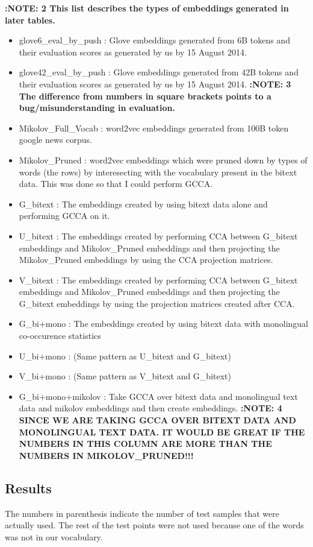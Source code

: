 \documentclass[11pt]{article}
\begin{document}
\textbf{:NOTE: 2 This list describes the types of
  embeddings generated in later tables.}
\begin{itemize}[noitemsep]
\item glove6\_eval\_by\_push : Glove embeddings generated from 6B
  tokens and their evaluation scores as generated by us by 15 August
  2014. 
\item glove42\_eval\_by\_push : Glove embeddings generated from 42B
  tokens and their evaluation scores as generated by us by 15 August
  2014. \textbf{:NOTE: 3 The difference from numbers in square brackets points to a
  bug/misunderstanding in evaluation.}
\item Mikolov\_Full\_Vocab : word2vec embeddings generated from 100B token
  google news corpus.
\item Mikolov\_Pruned : word2vec embeddings which were pruned down by
  types of words (the rows) by interesecting with the vocabulary
  present in the bitext data. This was done so that I could perform
  GCCA. 
\item G\_bitext : The embeddings created by using bitext data alone
  and performing GCCA on it. 
\item U\_bitext : The embeddings created by performing CCA between
  G\_bitext embeddings and Mikolov\_Pruned embeddings and then
  projecting the Mikolov\_Pruned embeddings by using the CCA
  projection matrices. 
\item V\_bitext : The embeddings created by performing CCA between
  G\_bitext embeddings and Mikolov\_Pruned embeddings and then
  projecting the G\_bitext embeddings by using the projection matrices
  created after CCA. 
\item G\_bi+mono : The embeddings created by using bitext data with
  monolingual co-occurence statistics
\item U\_bi+mono : (Same pattern as U\_bitext and G\_bitext)
\item V\_bi+mono : (Same pattern as V\_bitext and G\_bitext)
\item G\_bi+mono+mikolov : Take GCCA over bitext data and monolingual
  text data and mikolov embeddings and then create
  embeddings. \textbf{:NOTE: 4 SINCE WE ARE TAKING GCCA OVER BITEXT DATA AND
    MONOLINGUAL TEXT DATA. IT WOULD BE GREAT IF THE NUMBERS IN
    THIS COLUMN ARE MORE THAN THE NUMBERS IN MIKOLOV\_PRUNED!!!} 
\end{itemize}


\subsection{Results}
The numbers in parenthesis indicate the number of test samples that
were actually used. The rest of the test points were not used because
one of the words was not in our vocabulary.  
\end{document}
